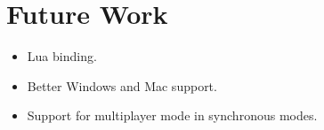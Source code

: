 \documentclass[english,bachelor,a4paper,twoside]{ppfcmthesis}
\begin{document}
\section{Future Work}
	\begin{itemize}
		\item Lua binding.
		\item Better Windows and Mac support.
		\item Support for multiplayer mode in synchronous modes.
	\end{itemize}


{\raggedright\sloppy\small}

\cleardoublepage\appendix%
%




\ppcolophon
\end{document}
